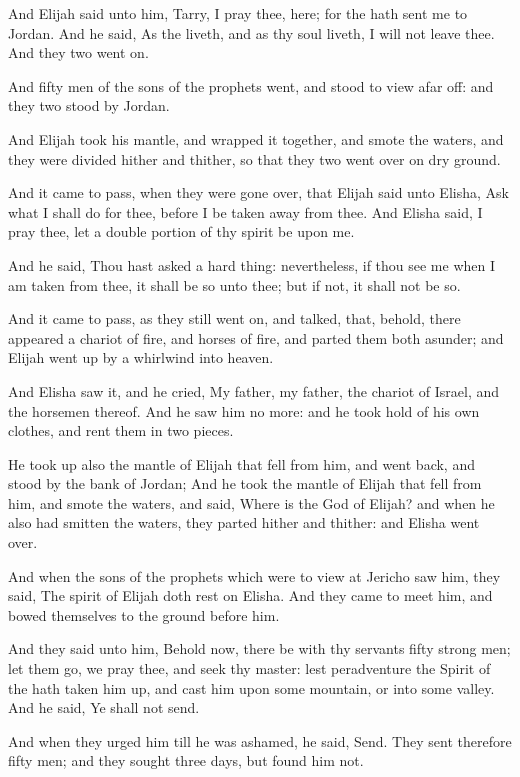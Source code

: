 \Verse And Elijah said unto him, Tarry, I pray thee, here; for the \LORD hath sent me to Jordan. And he said, As the \LORD liveth, and as thy soul liveth, I will not leave thee. And they two went on.

\Verse And fifty men of the sons of the prophets went, and stood to view afar off: and they two stood by Jordan.

\Verse And Elijah took his mantle, and wrapped it together, and smote the waters, and they were divided hither and thither, so that they two went over on dry ground.

\Verse And it came to pass, when they were gone over, that Elijah said unto Elisha, Ask what I shall do for thee, before I be taken away from thee. And Elisha said, I pray thee, let a double portion of thy spirit be upon me.

\Verse And he said, Thou hast asked a hard thing: nevertheless, if thou see me when I am taken from thee, it shall be so unto thee; but if not, it shall not be so.

\Verse And it came to pass, as they still went on, and talked, that, behold, there appeared a chariot of fire, and horses of fire, and parted them both asunder; and Elijah went up by a whirlwind into heaven.

\Verse And Elisha saw it, and he cried, My father, my father, the chariot of Israel, and the horsemen thereof. And he saw him no more: and he took hold of his own clothes, and rent them in two pieces.

\Verse He took up also the mantle of Elijah that fell from him, and went back, and stood by the bank of Jordan; \Verse And he took the mantle of Elijah that fell from him, and smote the waters, and said, Where is the \LORD God of Elijah? and when he also had smitten the waters, they parted hither and thither: and Elisha went over.

\Verse And when the sons of the prophets which were to view at Jericho saw him, they said, The spirit of Elijah doth rest on Elisha. And they came to meet him, and bowed themselves to the ground before him.

\Verse And they said unto him, Behold now, there be with thy servants fifty strong men; let them go, we pray thee, and seek thy master: lest peradventure the Spirit of the \LORD hath taken him up, and cast him upon some mountain, or into some valley. And he said, Ye shall not send.

\Verse And when they urged him till he was ashamed, he said, Send. They sent therefore fifty men; and they sought three days, but found him not.

